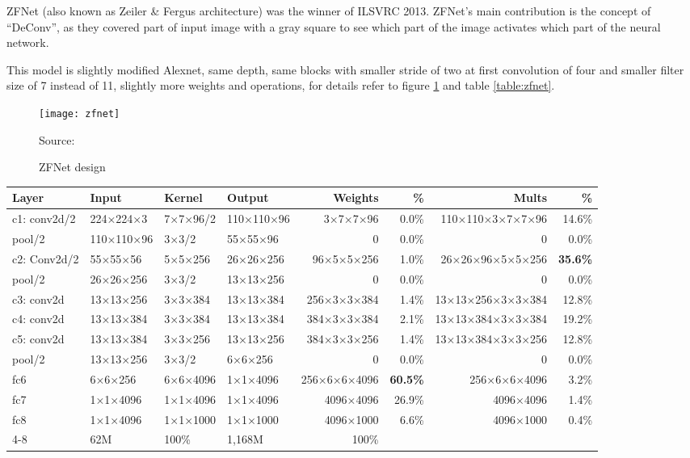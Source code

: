 ZFNet\autocite{zeiler2014visualizing} (also known as Zeiler \& Fergus architecture)
was the winner of ILSVRC 2013. ZFNet's main contribution is the concept of ``DeConv'',
as they covered part of input image with a gray square to see which part of the image activates which part of the neural network.

This model is slightly modified Alexnet, same depth, same blocks with smaller stride of two at first convolution of four
and smaller filter size of 7 instead of 11, slightly more weights and operations,
for details refer to figure \ref{fig:zfnet} and table \ref{table:zfnet}.

\begin{figure}[!h]
\centering
\texttt{[image: zfnet]}
\caption{ZFNet design}\label{fig:zfnet}
{Source: \autocite{zeiler2014visualizing}\hfill}
\end{figure}

\clearpage
\begin{landscape}
\clearpage
\centering

\begin{table*}\caption{Analysis of ZFNet layers}\label{table:zfnet}
\centering
\begin{tabularx}{\hsize}{Xlllrrrr}
\toprule
Layer & Input & Kernel & Output & Weights & \% & Mults & \% \\
\midrule
c1: conv2d/2 & 224×224×3 & 7×7×96/2 & 110×110×96 & 3×7×7×96 & 0.0\% & 110×110×3×7×7×96 & 14.6\% \\
pool/2 & 110×110×96 & 3×3/2 & 55×55×96 & 0 & 0.0\% & 0 & 0.0\% \\
c2: Conv2d/2 & 55×55×56 & 5×5×256 & 26×26×256 & 96×5×5×256 & 1.0\% & 26×26×96×5×5×256 & \textbf{35.6\%} \\
pool/2 & 26×26×256 & 3×3/2 & 13×13×256 & 0 & 0.0\% & 0 & 0.0\% \\
c3: conv2d & 13×13×256 & 3×3×384 & 13×13×384 & 256×3×3×384 & 1.4\% & 13×13×256×3×3×384 & 12.8\% \\
c4: conv2d & 13×13×384 & 3×3×384 & 13×13×384 & 384×3×3×384 & 2.1\% & 13×13×384×3×3×384 & 19.2\% \\
c5: conv2d & 13×13×384 & 3×3×256 & 13×13×256 & 384×3×3×256 & 1.4\% & 13×13×384×3×3×256 & 12.8\% \\
pool/2 & 13×13×256 & 3×3/2 & 6×6×256 & 0 & 0.0\% & 0 & 0.0\% \\
fc6 & 6×6×256 & 6×6×4096 & 1×1×4096 & 256×6×6×4096 & \textbf{60.5\%} & 256×6×6×4096 & 3.2\% \\
fc7 & 1×1×4096 & 1×1×4096 & 1×1×4096 & 4096×4096 & 26.9\% & 4096×4096 & 1.4\% \\
fc8 & 1×1×4096 & 1×1×1000 & 1×1×1000 & 4096×1000 & 6.6\% & 4096×1000 & 0.4\% \\
\cmidrule{4-8}
\multicolumn{4}{r}{Total} & 62M & 100\% & 1,168M & 100\% \\
\bottomrule
\end{tabularx}
\end{table*}

\end{landscape}
\clearpage

